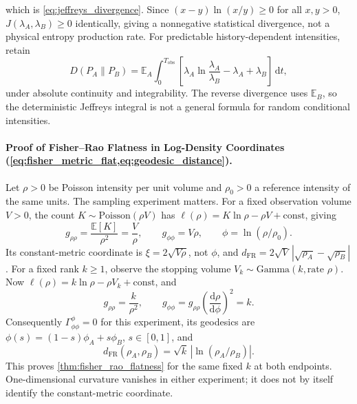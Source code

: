 which is \cref{eq:jeffreys_divergence}. Since $(x - y)\ln(x/y)
\ge 0$ for all $x, y > 0$, $J(\lambda_A, \lambda_B) \ge 0$ identically,
giving a nonnegative statistical divergence, not a physical entropy
production rate. For predictable history-dependent intensities, retain
\begin{equation}
  D(P_A\parallel P_B)=\mathbb{E}_A\int_0^{T_{\mathrm{obs}}}
  \left[\lambda_A\ln\frac{\lambda_A}{\lambda_B}-\lambda_A+\lambda_B\right]
  \,\mathrm{d}t,
\end{equation}
under absolute continuity and integrability. The reverse divergence
uses $\mathbb{E}_B$, so the deterministic Jeffreys integral is not a
general formula for random conditional intensities.

\paragraph{Proof of Fisher--Rao Flatness in Log-Density Coordinates
(\cref{eq:fisher_metric_flat,eq:geodesic_distance}).}
Let $\rho>0$ be Poisson intensity per unit volume and $\rho_0>0$ a
reference intensity of the same units. The sampling experiment matters.
For a fixed observation volume $V>0$, the count $K\sim\mathrm{Poisson}(\rho V)$
has $\ell(\rho)=K\ln\rho-\rho V+\mathrm{const}$, giving
\begin{equation}
  g_{\rho\rho}=\frac{\mathbb{E}[K]}{\rho^2}=\frac{V}{\rho},\qquad
  g_{\phi\phi}=V\rho,\qquad \phi=\ln(\rho/\rho_0).
\end{equation}
Its constant-metric coordinate is $\xi=2\sqrt{V\rho}$, not $\phi$,
and $d_{\mathrm{FR}}=2\sqrt V\,|\sqrt{\rho_A}-\sqrt{\rho_B}|$.
For a fixed rank $k\ge1$, observe the stopping volume
$V_k\sim\mathrm{Gamma}(k,\text{rate }\rho)$. Now
$\ell(\rho)=k\ln\rho-\rho V_k+\mathrm{const}$, and
\begin{equation}
  g_{\rho\rho}=\frac{k}{\rho^2},\qquad
  g_{\phi\phi}=g_{\rho\rho}\left(\frac{\mathrm{d}\rho}{\mathrm{d}\phi}\right)^2=k.
  \label{eq:supp_metric_transformed}
\end{equation}
Consequently $\Gamma^\phi_{\phi\phi}=0$ for this experiment, its
geodesics are $\phi(s)=(1-s)\phi_A+s\phi_B$, $s\in[0,1]$, and
\begin{equation}
  d_{\mathrm{FR}}(\rho_A,\rho_B)
  =\sqrt{k}\,|\ln(\rho_A/\rho_B)|.
\end{equation}
This proves \cref{thm:fisher_rao_flatness} for the same fixed $k$ at
both endpoints. One-dimensional curvature vanishes in either experiment;
it does not by itself identify the constant-metric coordinate.

